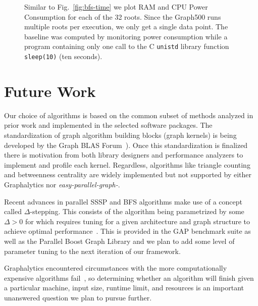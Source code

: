 \documentclass[conference]{IEEEtran}
\begin{document}
\begin{figure}
\begin{minipage}{0.78\linewidth}
	\end{minipage}
	\caption{Similar to Fig.~\ref{fig:bfs-time} we plot RAM and CPU Power Consumption for each of the 32 roots. Since the Graph500 runs multiple roots per execution, we only get a single data point. The baseline was computed by monitoring power consumption while a program containing only one call to the C \texttt{unistd} library function \texttt{sleep(10)} (ten seconds).}
	\label{fig:power}
\end{figure}

\section{Future Work}

Our choice of algorithms is based on the common subset of methods analyzed in prior work and implemented in the selected software packages. The standardization of graph algorithm building blocks (graph kernels) is being developed by the Graph BLAS Forum~\cite{Mattson:2013:graphblas}). Once this standardization is finalized there is motivation from both library designers and performance analyzers to implement and profile each kernel. Regardless, algorithms like triangle counting and betweenness centrality are widely implemented but not supported by either Graphalytics nor \emph{easy-parallel-graph\mbox{-\textasteriskcentered}}. 

Recent advances in parallel SSSP and BFS algorithms make use of a concept called $\Delta$-stepping. This consists of the algorithm being parametrized by some $\Delta > 0$ for which requires tuning for a given architecture and graph structure to achieve optimal performance~\cite{Panitanarak:2014:SSSPPerf}. This is provided in the GAP benchmark suite as well as the Parallel Boost Graph Library and we plan to add some level of parameter tuning to the next iteration of our framework.

Graphalytics encountered circumstances with the more computationally expensive algorithms fail~\cite{Iosup:2016:Graphalyticstech}, so determining whether an algorithm will finish given a particular machine, input size, runtime limit, and resources is an important unanswered question we plan to pursue further.
\end{document}
